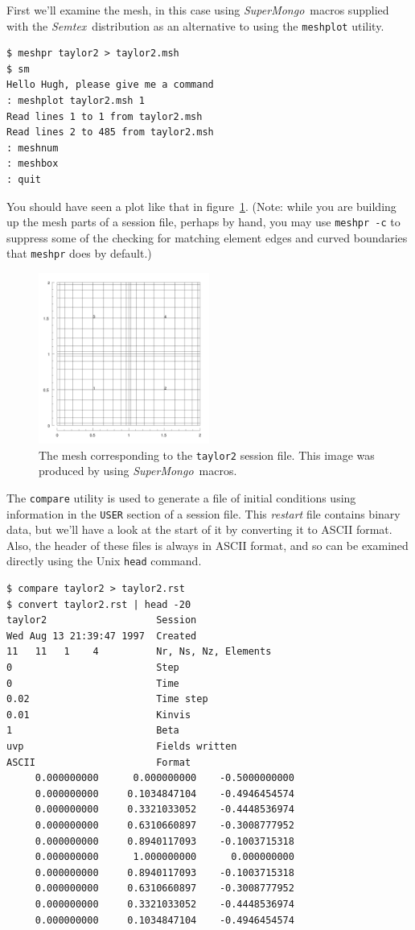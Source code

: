 \documentclass[11pt]{report}
\newcommand{\Semtex}{\emph{Semtex}} \newcommand{\Dog}{\emph{Dog}}
\newcommand{\SM}{\emph{SuperMongo}}
\begin{document}
First we'll examine the mesh, in this case using \SM\ macros supplied with the
\Semtex\ distribution as an alternative to using the \verb|meshplot|
utility.
%
{\small
\begin{verbatim}
$ meshpr taylor2 > taylor2.msh
$ sm
Hello Hugh, please give me a command
: meshplot taylor2.msh 1
Read lines 1 to 1 from taylor2.msh
Read lines 2 to 485 from taylor2.msh
: meshnum
: meshbox
: quit
\end{verbatim}
}
\noindent
You should have seen a plot like that in figure~\ref{tay2msh}. (Note:
while you are building up the mesh parts of a session file, perhaps by
hand, you may use \texttt{meshpr -c} to suppress some of the checking
for matching element edges and curved boundaries that \texttt{meshpr}
does by default.)
\begin{figure}
\begin{center}
\includegraphics[width=0.5\textwidth]{taylor2mesh}
\end{center}
\caption{
\label{tay2msh}
  The mesh corresponding to the \texttt{taylor2} session file.  This
  image was produced by using \SM\ macros.  }
\end{figure}

The \texttt{compare} utility is used to generate a file of initial
conditions using information in the \verb|USER| section of a session
file.  This \emph{restart} file contains binary data, but we'll have a
look at the start of it by converting it to ASCII format.  Also, the
header of these files is always in ASCII format, and so can be
examined directly using the Unix \texttt{head} command.  {\small
\begin{verbatim}
$ compare taylor2 > taylor2.rst
$ convert taylor2.rst | head -20
taylor2                   Session
Wed Aug 13 21:39:47 1997  Created
11   11   1    4          Nr, Ns, Nz, Elements
0                         Step
0                         Time
0.02                      Time step
0.01                      Kinvis
1                         Beta
uvp                       Fields written
ASCII                     Format
     0.000000000      0.000000000    -0.5000000000 
     0.000000000     0.1034847104    -0.4946454574 
     0.000000000     0.3321033052    -0.4448536974 
     0.000000000     0.6310660897    -0.3008777952 
     0.000000000     0.8940117093    -0.1003715318 
     0.000000000      1.000000000      0.000000000 
     0.000000000     0.8940117093    -0.1003715318 
     0.000000000     0.6310660897    -0.3008777952 
     0.000000000     0.3321033052    -0.4448536974 
     0.000000000     0.1034847104    -0.4946454574 
\end{verbatim}
}
\end{document}
